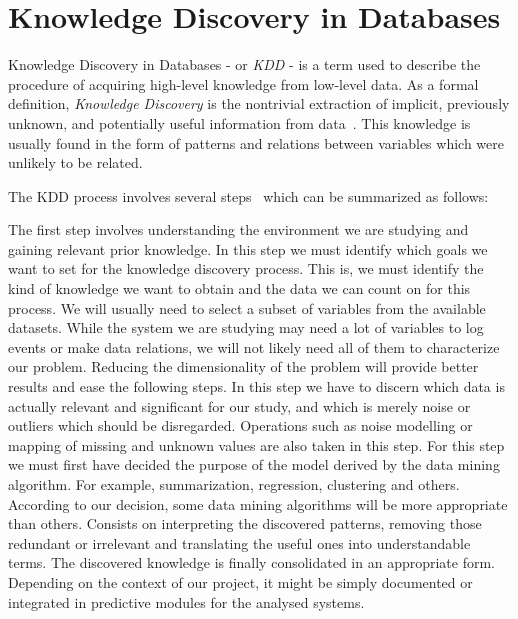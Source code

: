 \section{Knowledge Discovery in Databases}
Knowledge Discovery in Databases - or \emph{KDD} - is a term used to describe the procedure of acquiring high-level knowledge from low-level data. As a formal definition, \emph{Knowledge Discovery} is the nontrivial extraction of implicit, previously unknown, and potentially useful information from data~\cite{Frawley1992}. This knowledge is usually found in the form of patterns and relations between variables which were unlikely to be related.

The KDD process involves several steps~\cite{Feyyad1996} which can be summarized as follows:

\begin{enumerate}
  The first step involves understanding the environment we are studying and gaining relevant prior knowledge. In this step we must identify which goals we want to set for the knowledge discovery process. This is, we must identify the kind of knowledge we want to obtain and the data we can count on for this process.
  We will usually need to select a subset of variables from the available datasets. While the system we are studying may need a lot of variables to log events or make data relations, we will not likely need all of them to characterize our problem. Reducing the dimensionality of the problem will provide better results and ease the following steps.
  In this step we have to discern which data is actually relevant and significant for our study, and which is merely noise or outliers which should be disregarded. Operations such as noise modelling or mapping of missing and unknown values are also taken in this step.
  For this step we must first have decided the purpose of the model derived by the data mining algorithm. For example, summarization, regression, clustering and others. According to our decision, some data mining algorithms will be more appropriate than others.
  Consists on interpreting the discovered patterns, removing those redundant or irrelevant and translating the useful ones into understandable terms.
  The discovered knowledge is finally consolidated in an appropriate form. Depending on the context of our project, it might be simply documented or integrated in predictive modules for the analysed systems.
\end{enumerate}

